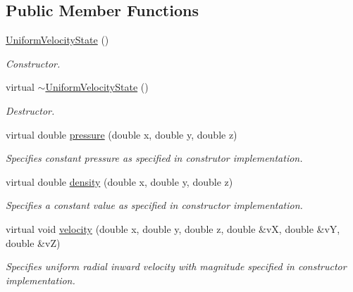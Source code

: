 \subsection*{Public Member Functions}
\begin{DoxyCompactItemize}
\item 
\hypertarget{classUniformVelocityState_a27b8930fb2779e80930915165f768a20}{\hyperlink{classUniformVelocityState_a27b8930fb2779e80930915165f768a20}{Uniform\-Velocity\-State} ()}\label{classUniformVelocityState_a27b8930fb2779e80930915165f768a20}

\begin{DoxyCompactList}\small\item\em Constructor. \end{DoxyCompactList}\item 
\hypertarget{classUniformVelocityState_ad906b817011d69cddf9699dbf0c84646}{virtual \hyperlink{classUniformVelocityState_ad906b817011d69cddf9699dbf0c84646}{$\sim$\-Uniform\-Velocity\-State} ()}\label{classUniformVelocityState_ad906b817011d69cddf9699dbf0c84646}

\begin{DoxyCompactList}\small\item\em Destructor. \end{DoxyCompactList}\item 
virtual double \hyperlink{classUniformVelocityState_a88e71904d7b4a8307e3f051b1001b691}{pressure} (double x, double y, double z)
\begin{DoxyCompactList}\small\item\em Specifies constant pressure as specified in construtor implementation. \end{DoxyCompactList}\item 
virtual double \hyperlink{classUniformVelocityState_a88f7d12486116646685269a63dea0dcf}{density} (double x, double y, double z)
\begin{DoxyCompactList}\small\item\em Specifies a constant value as specified in constructor implementation. \end{DoxyCompactList}\item 
virtual void \hyperlink{classUniformVelocityState_a17e65d536b62d522fcbaa2175bc5cbe7}{velocity} (double x, double y, double z, double \&v\-X, double \&v\-Y, double \&v\-Z)
\begin{DoxyCompactList}\small\item\em Specifies uniform radial inward velocity with magnitude specified in constructor implementation. \end{DoxyCompactList}\end{DoxyCompactItemize}


